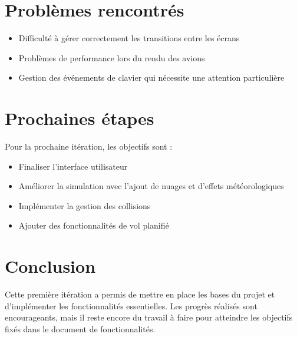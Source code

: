 \documentclass[12pt,a4paper]{article}
\begin{document}
\section{Problèmes rencontrés}
\begin{itemize}
    \item Difficulté à gérer correctement les transitions entre les écrans
    \item Problèmes de performance lors du rendu des avions
    \item Gestion des événements de clavier qui nécessite une attention particulière
\end{itemize}

\section{Prochaines étapes}
Pour la prochaine itération, les objectifs sont :
\begin{itemize}
    \item Finaliser l'interface utilisateur
    \item Améliorer la simulation avec l'ajout de nuages et d'effets météorologiques
    \item Implémenter la gestion des collisions
    \item Ajouter des fonctionnalités de vol planifié
\end{itemize}

\section{Conclusion}
Cette première itération a permis de mettre en place les bases du projet et d'implémenter les fonctionnalités essentielles. Les progrès réalisés sont encourageants, mais il reste encore du travail à faire pour atteindre les objectifs fixés dans le document de fonctionnalités.
\end{document}
